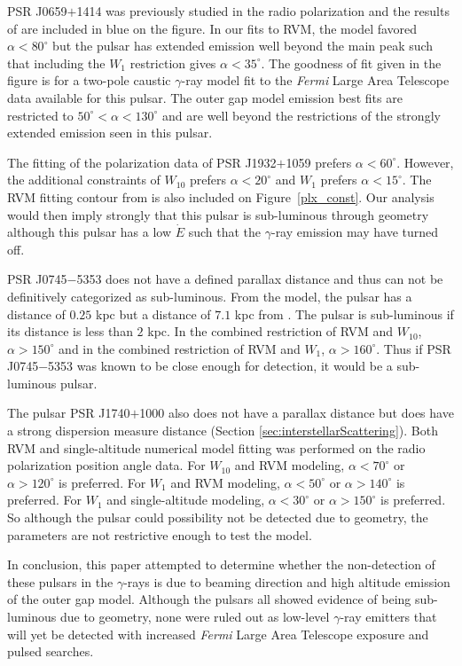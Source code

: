 PSR J0659$+$1414 was previously studied in the radio polarization
\citep{lyne1988shape,everett2001emission,weltevrede2010gamma} 
and the results of \cite{everett2001emission} are included in blue
on the figure.  In our fits to RVM, the model favored $\alpha<80^\circ$
but the pulsar has extended emission well beyond the main peak
such that including the $W_1$ restriction gives $\alpha<35^\circ$.
The goodness of fit given in the figure is for a two-pole caustic
$\gamma$-ray model fit to the {\it Fermi} Large Area Telescope data
available for this pulsar. 
The outer gap model emission best fits are restricted
to $50^\circ<\alpha<130^\circ$ and are well beyond the restrictions
of the strongly extended emission seen in this pulsar.  

The fitting of the polarization data of PSR J1932$+$1059 prefers 
$\alpha<60^\circ$.  However, the additional constraints of 
$W_{10}$ prefers $\alpha<20^\circ$ and $W_{1}$ prefers
$\alpha<15^\circ$.  The RVM fitting contour from
\cite{everett2001emission} is also included on Figure~\ref{plx_const}.
Our analysis would then imply strongly that 
this pulsar is sub-luminous through geometry 
although this pulsar
has a low $\dot{E}$ such that the $\gamma$-ray
emission may have turned off.

PSR J0745$-$5353 does not have a defined parallax distance and
thus can not be definitively categorized as sub-luminous.
From the \cite{cordes2002ne2001} model, the pulsar has a distance
of $0.25$ kpc but a distance of $7.1$ kpc from \cite{taylor1993pulsar}.
The pulsar is sub-luminous if its distance is less than $2$ kpc.
In the combined restriction of RVM and $W_{10}$, $\alpha>150^\circ$
and in the combined restriction of RVM and $W_{1}$, $\alpha>160^\circ$.
Thus if PSR J0745$-$5353 was known to be close enough for detection,
it would be a sub-luminous pulsar.

The pulsar PSR J1740$+$1000 also does not have a parallax distance but
does have a strong dispersion measure distance (Section \ref{sec:interstellarScattering}).  
Both RVM and single-altitude numerical model
fitting was performed on the radio polarization position angle data.
For $W_{10}$ and RVM modeling, $\alpha<70^\circ$ or $\alpha>120^\circ$
is preferred.
For $W_{1}$ and RVM modeling, $\alpha<50^\circ$ or $\alpha>140^\circ$
is preferred.
For $W_{1}$ and single-altitude modeling, $\alpha<30^\circ$ or $\alpha>150^\circ$
is preferred.
So although the pulsar could possibility not be detected due to 
geometry, the parameters are not restrictive enough
to test the model.

In conclusion, this paper attempted to determine whether the non-detection
of these pulsars in the $\gamma$-rays is due to beaming direction
and high altitude emission of the outer gap model.
Although the pulsars all showed evidence of being
sub-luminous due to geometry, none were ruled out
as low-level $\gamma$-ray emitters that will yet be detected
with increased {\it Fermi} Large Area Telescope exposure and pulsed searches.

